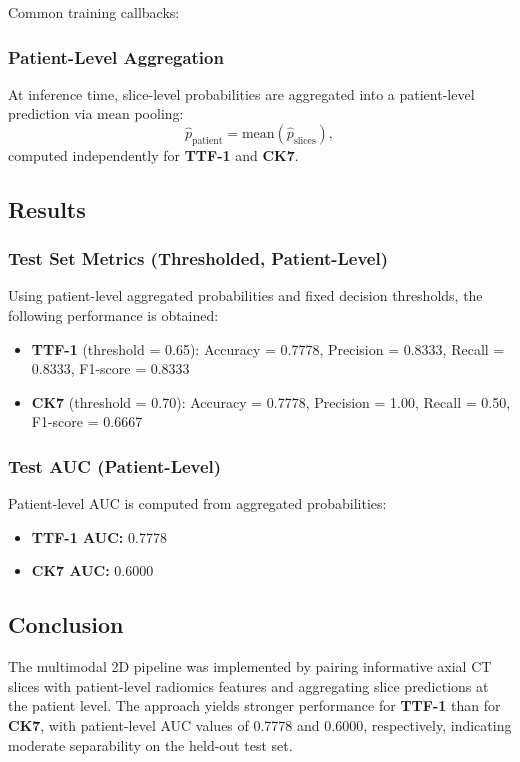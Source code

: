 Common training callbacks:

\subsubsection{Patient-Level Aggregation}
At inference time, slice-level probabilities are aggregated into a patient-level prediction via mean pooling:
\[
\hat{p}_{\text{patient}} = \mathrm{mean}\left(\hat{p}_{\text{slices}}\right),
\]
computed independently for \textbf{TTF-1} and \textbf{CK7}.

\subsection{Results}

\subsubsection{Test Set Metrics (Thresholded, Patient-Level)}
Using patient-level aggregated probabilities and fixed decision thresholds, the following performance is obtained:
\begin{itemize}
    \item \textbf{TTF-1} (threshold = 0.65): Accuracy = 0.7778, Precision = 0.8333, Recall = 0.8333, F1-score = 0.8333
    \item \textbf{CK7} (threshold = 0.70): Accuracy = 0.7778, Precision = 1.00, Recall = 0.50, F1-score = 0.6667
\end{itemize}

\subsubsection{Test AUC (Patient-Level)}
Patient-level AUC is computed from aggregated probabilities:
\begin{itemize}
    \item \textbf{TTF-1 AUC:} 0.7778
    \item \textbf{CK7 AUC:} 0.6000
\end{itemize}

\subsection{Conclusion}
The multimodal 2D pipeline was implemented by pairing informative axial CT slices with patient-level radiomics features and aggregating slice predictions at the patient level. The approach yields stronger performance for \textbf{TTF-1} than for \textbf{CK7}, with patient-level AUC values of 0.7778 and 0.6000, respectively, indicating moderate separability on the held-out test set.
